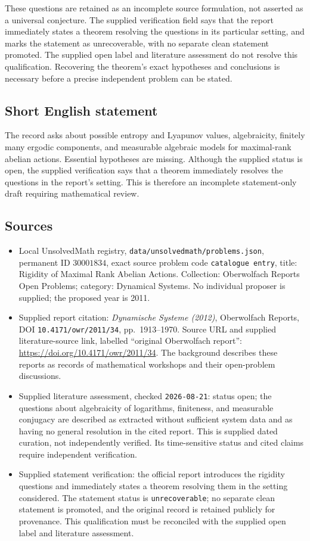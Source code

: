 \documentclass[11pt]{article}
\begin{document}
These questions are retained as an incomplete source formulation, not asserted as a universal conjecture. The supplied verification field says that the report immediately states a theorem resolving the questions in its particular setting, and marks the statement as unrecoverable, with no separate clean statement promoted. The supplied open label and literature assessment do not resolve this qualification. Recovering the theorem's exact hypotheses and conclusions is necessary before a precise independent problem can be stated.
\subsection{Short English statement}
The record asks about possible entropy and Lyapunov values, algebraicity, finitely many ergodic components, and measurable algebraic models for maximal-rank abelian actions. Essential hypotheses are missing. Although the supplied status is open, the supplied verification says that a theorem immediately resolves the questions in the report's setting. This is therefore an incomplete statement-only draft requiring mathematical review.
\subsection{Sources}
\begin{itemize}
\item Local UnsolvedMath registry, \texttt{data/unsolvedmath/problems.json}, permanent ID \(30001834\), exact source problem code \texttt{catalogue entry}, title: Rigidity of Maximal Rank Abelian Actions. Collection: Oberwolfach Reports Open Problems; category: Dynamical Systems. No individual proposer is supplied; the proposed year is 2011.
\item Supplied report citation: \emph{Dynamische Systeme (2012)}, Oberwolfach Reports, DOI \texttt{10.4171/owr/2011/34}, pp.\ 1913--1970. Source URL and supplied literature-source link, labelled ``original Oberwolfach report'': \url{https://doi.org/10.4171/owr/2011/34}. The background describes these reports as records of mathematical workshops and their open-problem discussions.
\item Supplied literature assessment, checked \texttt{2026-08-21}: status open; the questions about algebraicity of logarithms, finiteness, and measurable conjugacy are described as extracted without sufficient system data and as having no general resolution in the cited report. This is supplied dated curation, not independently verified. Its time-sensitive status and cited claims require independent verification.
\item Supplied statement verification: the official report introduces the rigidity questions and immediately states a theorem resolving them in the setting considered. The statement status is \texttt{unrecoverable}; no separate clean statement is promoted, and the original record is retained publicly for provenance. This qualification must be reconciled with the supplied open label and literature assessment.
\end{itemize}
\end{document}
